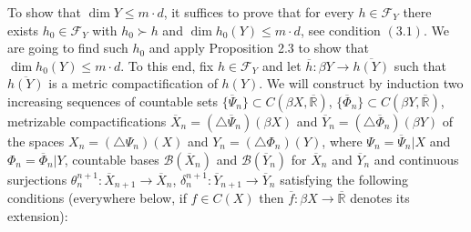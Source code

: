 \documentclass[12pt]{amsart}
\begin{document}
To show that $\dim Y\leq m\cdot d$, it suffices to prove that for every $h\in\mathcal F_{Y}$ there exists  $h_0\in\mathcal F_{Y}$ with $h_0\succ h$ and $\dim h_0(Y)\leq m\cdot d$, see condition $(3.1)$. We are going to find such $h_0$ and apply Proposition 2.3 to show that  $\dim h_0(Y)\leq m\cdot d$.
To this end, fix $h\in\mathcal F_{Y}$ and let $\overline h:\beta Y\to\overline{h(Y)}$ such that $\overline{h(Y)}$ is a metric compactification of $h(Y)$. 
We will construct by induction two increasing sequences of countable sets 
$\{\overline\Psi_n\}\subset C(\beta X,\overline{\mathbb R})$, $\{\overline\Phi_n\}\subset C(\beta Y,\overline{\mathbb R})$, metrizable compactifications $\overline X_n=(\triangle\overline\Psi_n)(\beta X)$ and $\overline Y_n=(\triangle\overline\Phi_n)(\beta Y)$ of
the spaces $X_n=(\triangle\Psi_n)(X)$ and $Y_n=(\triangle\Phi_n)(Y)$, where $\Psi_n=\overline\Psi_n|X$ and $\Phi_n=\overline\Phi_n|Y$, 
countable bases $\mathcal B(\overline X_n)$ and $\mathcal B(\overline Y_n)$ for $\overline X_n$ and 
$\overline Y_n$ and continuous surjections $\theta^{n+1}_n:\overline X_{n+1}\to\overline X_n$, $\delta^{n+1}_n:\overline Y_{n+1}\to\overline Y_n$
satisfying the following conditions (everywhere below, if $f\in C(X)$ then $\overline f:\beta X\to\overline{\mathbb R}$ denotes its extension):
\end{document}
